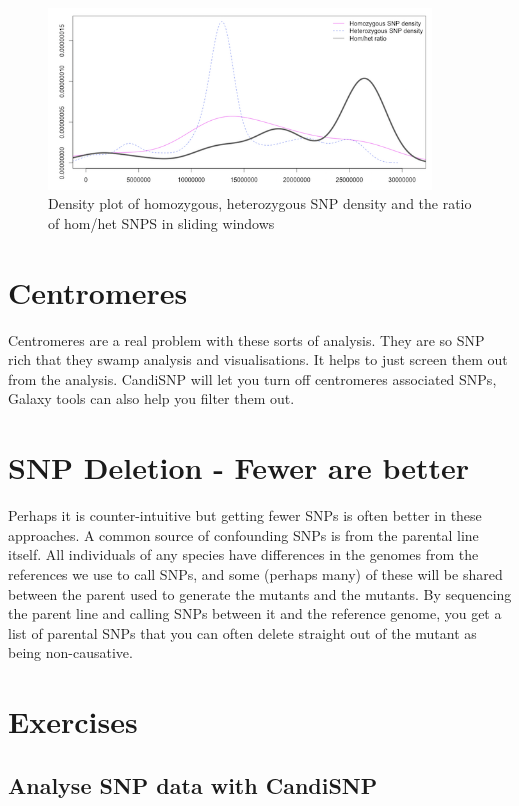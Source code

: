 \documentclass[12pt,]{book}
\begin{document}
\begin{figure}
\includegraphics[width=4in]{assets/density} \caption{Density plot of homozygous, heterozygous SNP density and
the ratio of hom/het SNPS in sliding windows}\label{fig:densityp}
\end{figure}

\section{Centromeres}\label{centromeres}

Centromeres are a real problem with these sorts of analysis. They are so
SNP rich that they swamp analysis and visualisations. It helps to just
screen them out from the analysis. CandiSNP will let you turn off
centromeres associated SNPs, Galaxy tools can also help you filter them
out.

\section{SNP Deletion - Fewer are
better}\label{snp-deletion---fewer-are-better}

Perhaps it is counter-intuitive but getting fewer SNPs is often better
in these approaches. A common source of confounding SNPs is from the
parental line itself. All individuals of any species have differences in
the genomes from the references we use to call SNPs, and some (perhaps
many) of these will be shared between the parent used to generate the
mutants and the mutants. By sequencing the parent line and calling SNPs
between it and the reference genome, you get a list of parental SNPs
that you can often delete straight out of the mutant as being
non-causative.

\section{Exercises}\label{exercises-3}

\subsection{Analyse SNP data with
CandiSNP}\label{analyse-snp-data-with-candisnp}
\end{document}
